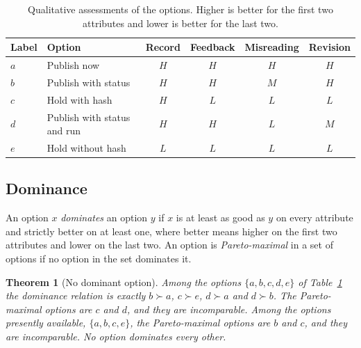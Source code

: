 \documentclass[11pt]{article}
\theoremstyle{plain}
\newtheorem{theorem}{Theorem}[section]
\theoremstyle{definition}
\theoremstyle{remark}
\begin{document}
\begin{table}[ht]
\centering
\small
\begin{tabular}{@{}llcccc@{}}
\toprule
Label & Option & Record & Feedback & Misreading & Revision \\
\midrule
$a$ & Publish now & $H$ & $H$ & $H$ & $H$ \\
$b$ & Publish with status & $H$ & $H$ & $M$ & $H$ \\
$c$ & Hold with hash & $H$ & $L$ & $L$ & $L$ \\
$d$ & Publish with status and run & $H$ & $H$ & $L$ & $M$ \\
$e$ & Hold without hash & $L$ & $L$ & $L$ & $L$ \\
\bottomrule
\end{tabular}
\caption{Qualitative assessments of the options. Higher is better for the first two attributes and lower is better for the last two.}
\label{tab:options}
\end{table}

\subsection{Dominance}

An option $x$ \emph{dominates} an option $y$ if $x$ is at least as good as $y$ on every attribute and strictly better on at least one, where better means higher on the first two attributes and lower on the last two. An option is \emph{Pareto-maximal} in a set of options if no option in the set dominates it.

\begin{theorem}[No dominant option]\label{thm:nodominant}
Among the options $\{a,b,c,d,e\}$ of Table~\ref{tab:options} the dominance relation is exactly $b\succ a$, $c\succ e$, $d\succ a$ and $d\succ b$. The Pareto-maximal options are $c$ and $d$, and they are incomparable. Among the options presently available, $\{a,b,c,e\}$, the Pareto-maximal options are $b$ and $c$, and they are incomparable. No option dominates every other.
\end{theorem}
\end{document}
